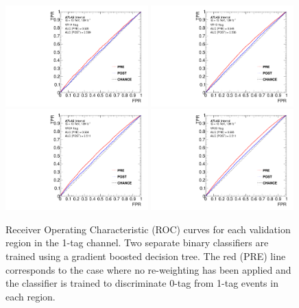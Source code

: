 \begin{figure}[htbp!]
\begin{center}
\includegraphics[width=0.49\textwidth]{BDT/VHqqbbBDTRocCurve_VR1A_1tag.pdf}
\includegraphics[width=0.49\textwidth]{BDT/VHqqbbBDTRocCurve_VR1B_1tag.pdf} \\
\includegraphics[width=0.49\textwidth]{BDT/VHqqbbBDTRocCurve_VR2A_1tag.pdf}
\includegraphics[width=0.49\textwidth]{BDT/VHqqbbBDTRocCurve_VR2B_1tag.pdf}
\end{center}
\caption{ Receiver Operating Characteristic (ROC) curves for each validation region in the 1-tag channel. Two separate binary classifiers are trained using a gradient boosted decision tree.
    The red (PRE) line corresponds to the case where no re-weighting has been applied and the classifier is trained to discriminate 0-tag from 1-tag events in each region.
}
\end{figure}
